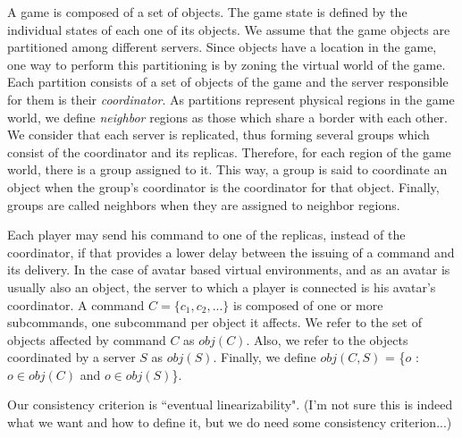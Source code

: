 \documentclass[times, 10pt]{article}
\begin{document}
A game is composed of a set of objects. The game state is defined by the individual states of each one of its objects. We assume that the game objects are partitioned among different servers. Since objects have a location in the game, one way to perform this partitioning is by zoning the virtual world of the game. Each partition consists of a set of objects of the game and the server responsible for them is their \emph{coordinator}. As partitions represent physical regions in the game world, we define \emph{neighbor} regions as those which share a border with each other. We consider that each server is replicated, thus forming several groups which consist of the coordinator and its replicas. Therefore, for each region of the game world, there is a group assigned to it. This way, a group is said to coordinate an object when the group's coordinator is the coordinator for that object. Finally, groups are called neighbors when they are assigned to neighbor regions.

Each player may send his command to one of the replicas, instead of the coordinator, if that provides a lower delay between the issuing of a command and its delivery. In the case of avatar based virtual environments, and as an avatar is usually also an object, the server to which a player is connected is his avatar's coordinator. A command $C = \{ c_1, c_2, ... \}$ is composed of one or more subcommands, one subcommand per object it affects. We refer to the set of objects affected by command $C$ as $obj(C)$. Also, we refer to the objects coordinated by a server $S$ as $obj(S)$. Finally, we define $obj(C,S)$ = \{$o$ : $o \in obj(C)$ and $o \in obj(S)$\}.


Our consistency criterion is ``eventual linearizability". (I'm not sure this is indeed what we want and how to define it, but we do need some consistency criterion...)


% 
%
%
\end{document}

